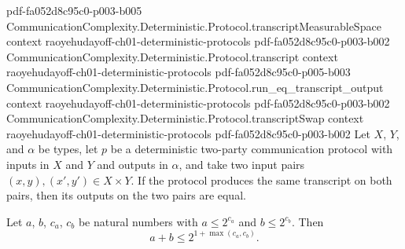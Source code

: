 \begin{theorem}
  {pdf-fa052d8c95c0-p003-b005}
\proofstep
  {CommunicationComplexity.Deterministic.Protocol.transcriptMeasurableSpace}
  {context}
  {raoyehudayoff-ch01-deterministic-protocols}
  {pdf-fa052d8c95c0-p003-b002}
\proofstep
  {CommunicationComplexity.Deterministic.Protocol.transcript}
  {context}
  {raoyehudayoff-ch01-deterministic-protocols}
  {pdf-fa052d8c95c0-p005-b003}
\proofstep
  {CommunicationComplexity.Deterministic.Protocol.run_eq_transcript_output}
  {context}
  {raoyehudayoff-ch01-deterministic-protocols}
  {pdf-fa052d8c95c0-p003-b002}
\proofstep
  {CommunicationComplexity.Deterministic.Protocol.transcriptSwap}
  {context}
  {raoyehudayoff-ch01-deterministic-protocols}
  {pdf-fa052d8c95c0-p003-b002}
Let $X$, $Y$, and $\alpha$ be types, let $p$ be a deterministic two-party communication
protocol with inputs in $X$ and $Y$ and outputs in $\alpha$, and take two input pairs
$(x,y),(x',y')\in X\times Y$. If the protocol produces the same transcript on both
pairs, then its outputs on the two pairs are equal.
\end{theorem}

\begin{theorem}
\label{CommunicationComplexity.Deterministic.Protocol.card_transcript_le_two_pow_complexity_aux}
\leanok
{}
Let $a$, $b$, $c_a$, $c_b$ be natural numbers with $a \le 2^{c_a}$ and $b \le 2^{c_b}$.
Then
\[
a + b \le 2^{1 + \max(c_a, c_b)}.
\]
\end{theorem}

